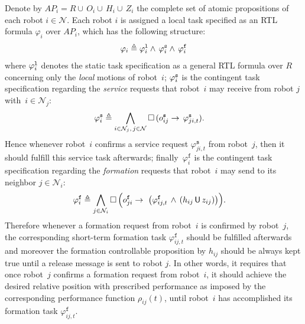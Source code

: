 Denote by ${AP}_i={R} \cup \, O_i \cup \,H_i \cup \,Z_i$ the complete set of atomic propositions of each robot $i\in \mathcal{N}$. Each robot $i$ is assigned a local task specified as an RTL formula $\varphi_i$ over ${AP}_i$, which has the following structure:
\begin{equation}\label{ch03:eq:task}
\varphi_i \triangleq  \varphi_i^{\textup{\texttt{l}}}\wedge\, \varphi_i^{\textup{\texttt{s}}}\wedge\, \varphi_i^{\texttt{f}}
\end{equation}
where $\varphi_i^{\textup{\texttt{l}}}$ denotes the {static} task specification as a general RTL formula over $R$ concerning only the \emph{local} motions of robot~$i$;
 $\varphi_i^{\textup{\texttt{s}}}$ is the  {contingent} task specification regarding the \emph{service} requests that robot~$i$ may receive from robot $j$ with~$i\in \mathcal{N}_j$:
\begin{equation}\label{ch03:eq:service}
\begin{aligned}
\varphi_i^{\textup{\texttt{s}}}&\triangleq \bigwedge_{i\in \mathcal{N}_j,\,j\in \mathcal{N}} \square\, (o^\texttt{s}_{ij} \rightarrow  \, \varphi_{ji,t}^{\texttt{s}}).
\end{aligned}
\end{equation}
Hence whenever robot~$i$ confirms a service request $\varphi_{ji,t}^{\texttt{s}}$ from robot~$j$, then it should fulfill this service task afterwards;
finally~$\varphi_i^{\texttt{f}}$ is the contingent task specification regarding the \emph{formation} requests that robot~$i$ may send to its neighbor $j\in \mathcal{N}_i$:
\begin{equation}\label{ch03:eq:perf-task}
\begin{aligned}
\varphi_i^{\textup{\texttt{f}}}&\triangleq \bigwedge_{j\in \mathcal{N}_i} \square\, \Big(o^\texttt{f}_{ji} \rightarrow  \, \, \big( \varphi_{ij,t}^\texttt{f} \,\wedge\, (h_{ij} \, \mathsf{U} \,z_{ij}) \big)\Big).
\end{aligned}
\end{equation}
Therefore whenever a formation request from robot~$i$ is confirmed by robot~$j$, the corresponding short-term formation task $\varphi_{ij,t}^\texttt{f}$ should be fulfilled afterwards and moreover the formation controllable proposition by $h_{ij}$ should be always kept true until a release message is sent to robot $j$.
In other words, it requires that once robot~$j$ confirms a formation request from robot~$i$, it should achieve the desired relative position with prescribed performance  as imposed by the corresponding performance function $\rho_{ij}(t)$, until robot~$i$ has accomplished its formation task $\varphi_{ij,t}^\texttt{f}$.

